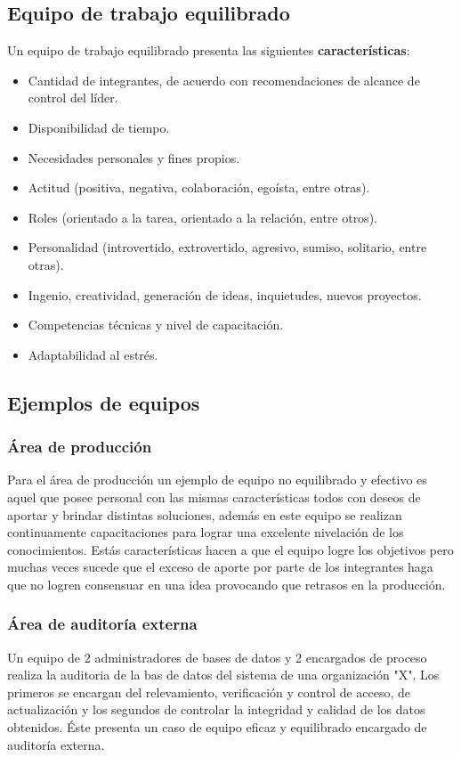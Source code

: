 \subsection{Equipo de trabajo equilibrado}

Un equipo de trabajo equilibrado presenta las siguientes \textbf{características}:

\begin{itemize}
    \item Cantidad de integrantes, de acuerdo con recomendaciones de alcance de control del líder.
    \item Disponibilidad de tiempo.
    \item Necesidades personales y fines propios.
    \item Actitud (positiva, negativa, colaboración, egoísta, entre otras).
    \item Roles (orientado a la tarea, orientado a la relación, entre otros).
    \item Personalidad (introvertido, extrovertido, agresivo, sumiso, solitario, entre otras).
    \item Ingenio, creatividad, generación de ideas, inquietudes, nuevos proyectos.
    \item Competencias técnicas y nivel de capacitación.
    \item Adaptabilidad al estrés.
\end{itemize}

\subsection{Ejemplos de equipos}
\subsubsection{Área de producción}
Para el área de producción un ejemplo de equipo no equilibrado y efectivo es aquel que posee  personal con las mismas características todos con deseos de aportar y brindar distintas soluciones, además en este equipo se realizan continuamente capacitaciones para lograr una excelente nivelación de los conocimientos.
Estás características hacen a que el equipo logre los objetivos pero muchas veces sucede que el exceso de aporte por parte de los integrantes haga que no logren consensuar en una idea provocando que retrasos en la producción.
\subsubsection{Área de auditoría externa}
Un equipo de 2 administradores de bases de datos y 2 encargados de proceso realiza la auditoria de la bas de datos del sistema de una organización "X". Los primeros se encargan del relevamiento, verificación y control de acceso, de actualización y los segundos de controlar la integridad y calidad de los datos obtenidos. Éste presenta un caso de equipo eficaz y equilibrado encargado de auditoría externa.


